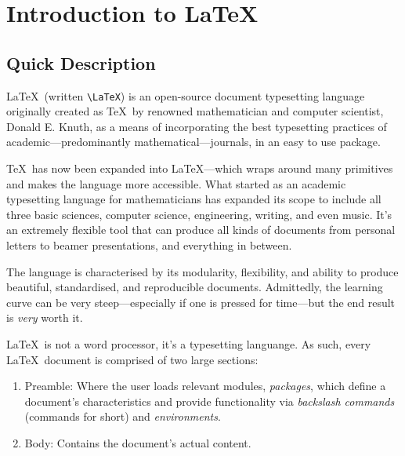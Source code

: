 \chapter{Introduction to \LaTeX}
%
\section{Quick Description}\label{s:qd}
\LaTeX~(written \verb|\LaTeX|) is an open-source document typesetting language originally created as \TeX~by renowned mathematician and computer scientist, Donald E. Knuth, as a means of incorporating the best typesetting practices of academic---predominantly mathematical---journals, in an easy to use package. 

\TeX~has now been expanded into \LaTeX---which wraps around many primitives and makes the language more accessible. What started as an academic typesetting language for mathematicians has expanded its scope to include all three basic sciences, computer science, engineering, writing, and even music. It's an extremely flexible tool that can produce all kinds of documents from personal letters to beamer presentations, and everything in between.

The language is characterised by its modularity, flexibility, and ability to produce beautiful, standardised, and reproducible documents. Admittedly, the learning curve can be very steep---especially if one is pressed for time---but the end result is \emph{very} worth it.

\LaTeX~is not a word processor, it's a typesetting languange. As such, every \LaTeX~document is comprised of two large sections:
\begin{enumerate}
    \item Preamble: Where the user loads relevant modules, \emph{packages}, which define a document's characteristics and provide functionality via \emph{backslash commands} (commands for short) and \emph{environments}.
    \item Body: Contains the document's actual content.
\end{enumerate}
%
